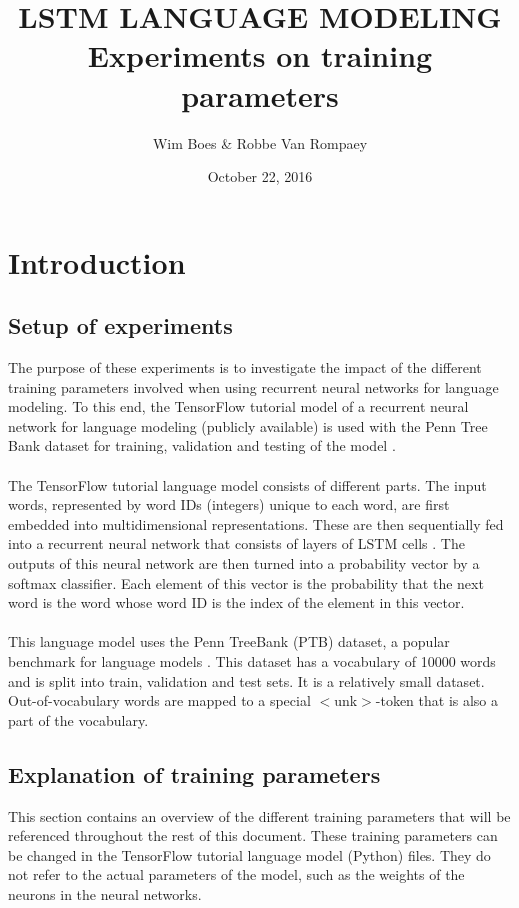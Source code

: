 \documentclass[10pt,a4paper,titlepage]{article}
\author{Wim Boes \& Robbe Van Rompaey}
\title{LSTM LANGUAGE MODELING\\Experiments on training parameters}
\date{October 22, 2016}
\begin{document}
\maketitle	

\setcounter{tocdepth}{2}
\tableofcontents

\newpage

\section{Introduction}

\subsection{Setup of experiments}
\label{sec:setup}

The purpose of these experiments is to investigate the impact of the different training parameters involved when using recurrent neural networks for language modeling. To this end, the TensorFlow tutorial model of a recurrent neural network for language modeling (publicly available) is used with the Penn Tree Bank dataset for training, validation and testing of the model \cite{tensorflow}.\\
\\
The TensorFlow tutorial language model consists of different parts. The input words, represented by word IDs (integers) unique to each word, are first embedded into multidimensional representations. These are then sequentially fed into a recurrent neural network that consists of layers of LSTM cells \cite{LSTM}. The outputs of this neural network are then turned into a probability vector by a softmax classifier. Each element of this vector is the probability that the next word is the word whose word ID is the index of the element in this vector.\\
\\
This language model uses the Penn TreeBank (PTB) dataset, a popular benchmark for language models \cite{PTB}. This dataset has a vocabulary of 10000 words and is split into train, validation and test sets. It is a relatively small dataset. Out-of-vocabulary words are mapped to a special $<$unk$>$-token that is also a part of the vocabulary.

\subsection{Explanation of training parameters}
\label{subsec:exp}

This section contains an overview of the different training parameters that will be referenced throughout the rest of this document. These training parameters can be changed in the TensorFlow tutorial language model (Python) files. They do not refer to the actual parameters of the model, such as the weights of the neurons in the neural networks.
\end{document}
